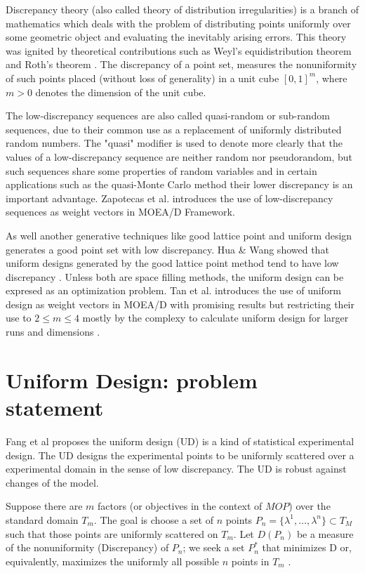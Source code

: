 \documentclass[a4paper,10pt]{llncs}
\begin{document}
Discrepancy theory (also called theory of distribution irregularities) is a branch of mathematics which deals with the problem of distributing points uniformly over some geometric object and evaluating the inevitably arising errors. This theory was ignited by theoretical contributions such as Weyl's equidistribution theorem and Roth's theorem \cite{roth1955rational}. The discrepancy of a point set, measures the nonuniformity of such points placed (without loss of generality) in a unit cube $[0,1]^m$, where $m > 0$ denotes the dimension of the unit cube.

The low-discrepancy sequences are also called quasi-random or sub-random sequences, due to their common use as a replacement of uniformly distributed random numbers. The "quasi" modifier is used to denote more clearly that the values of a low-discrepancy sequence are neither random nor pseudorandom, but such sequences share some properties of random variables and in certain applications such as the quasi-Monte Carlo method their lower discrepancy is an important advantage. Zapotecas et al. introduces the use of low-discrepancy sequences as weight vectors in MOEA/D Framework\cite{zapotecas2015low}.

As well another generative techniques like good lattice point and uniform design generates a good point set with low discrepancy. Hua \& Wang showed that uniform designs generated by the good lattice point method tend to have low discrepancy \cite{hua2012applications}. Unless both are space filling methods, the uniform design can be expresed as an optimization problem. Tan et al. introduces the use of uniform design as weight vectors in MOEA/D with promising results but restricting their use to $2 \leq m \leq 4$ mostly by the complexy to calculate uniform design for larger runs and dimensions \cite{tan2013moea}.    

\section{Uniform Design: problem statement } %

Fang et al proposes the uniform design (UD) is a kind of statistical experimental design\cite{fang1980uniform}. The UD designs the experimental points to be uniformly scattered over a experimental domain in the sense of low discrepancy\cite{fang1994some}. The UD is robust against changes of the model\cite{xie2000admissibility}.  

Suppose there are $m$ factors (or objectives in the context of $MOP$) over the standard domain $T_m$. The goal is choose a set of $n$ points $P_n=\{\lambda^1,\dots,\lambda^n\} \subset T_M$ such that those points are uniformly scattered on $T_m$. Let $D(P_n)$ be a measure of the nonuniformity (Discrepancy) of $P_n$; we seek a set $P_n^*$ that minimizes D or, equivalently, maximizes the uniformly all possible $n$ points in $T_m$ .
\end{document}

